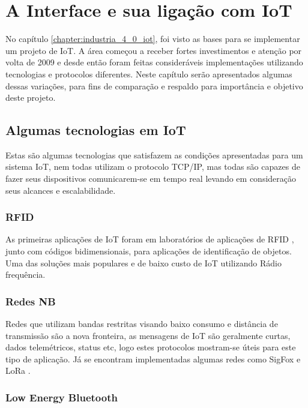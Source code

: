 \chapter{A Interface e sua ligação com IoT}
\label{chapter:interface_iot}

No capítulo \ref{chapter:industria_4_0_iot}, foi visto as bases para se implementar um projeto de IoT. A área começou a receber fortes investimentos e atenção por volta de 2009 e desde então foram feitas consideráveis implementações utilizando tecnologias e protocolos diferentes. Neste capítulo serão apresentados algumas dessas variações, para fins de comparação e respaldo para importância e objetivo deste projeto.


\section{Algumas tecnologias em IoT}
\label{section:tecnologias_iot}

Estas são algumas tecnologias que satisfazem as condições apresentadas para um sistema IoT, nem todas utilizam o protocolo TCP/IP, mas todas são  capazes de fazer seus dispositivos comunicarem-se em tempo real levando em consideração seus alcances e escalabilidade.

\subsection{RFID}
\label{subsection:rfid}

As primeiras aplicações de IoT foram em laboratórios de aplicações de RFID \cite{Rampim:iot}, junto com códigos bidimensionais, para aplicações de identificação de objetos. Uma das soluções mais populares e de baixo custo de IoT utilizando Rádio frequência.

\subsection{Redes NB}
\label{subsection:nb}

Redes que utilizam bandas restritas visando baixo consumo e distância de transmissão são a nova fronteira, as mensagens de IoT são geralmente curtas, dados telemétricos, status etc, logo estes protocolos mostram-se úteis para este tipo de aplicação. Já se encontram implementadas algumas redes como SigFox \cite{Sigfox} e LoRa \cite{LoRa}. 

\subsection{Low Energy Bluetooth}
\label{subsection:bluetooth}

